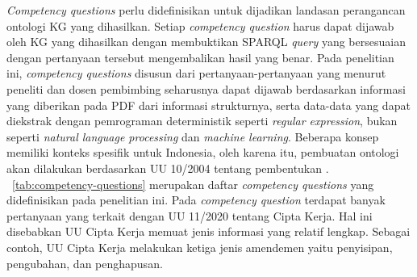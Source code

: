 \textit{Competency questions} perlu didefinisikan untuk dijadikan landasan perangancan ontologi KG
yang dihasilkan. Setiap \textit{competency question} harus dapat dijawab oleh KG yang dihasilkan
dengan membuktikan SPARQL \textit{query} yang bersesuaian dengan pertanyaan tersebut mengembalikan
hasil yang benar. Pada penelitian ini, \textit{competency questions} disusun dari
pertanyaan-pertanyaan yang menurut peneliti dan dosen pembimbing seharusnya dapat dijawab
berdasarkan informasi yang diberikan pada PDF dari informasi strukturnya, serta data-data yang dapat
diekstrak dengan pemrograman deterministik seperti \textit{regular expression}, bukan seperti
\textit{natural language processing} dan \textit{machine learning}. Beberapa konsep \legal memiliki
konteks spesifik untuk Indonesia, oleh karena itu, pembuatan ontologi akan dilakukan berdasarkan UU
10/2004 tentang pembentukan \legal. \tab~\ref{tab:competency-questions} merupakan daftar
\textit{competency questions} yang didefinisikan pada penelitian ini. Pada \textit{competency
question} terdapat banyak pertanyaan yang terkait dengan UU 11/2020 tentang Cipta Kerja. Hal ini
disebabkan UU Cipta Kerja memuat jenis informasi yang relatif lengkap. Sebagai contoh, UU Cipta
Kerja melakukan ketiga jenis amendemen yaitu penyisipan, pengubahan, dan penghapusan.


